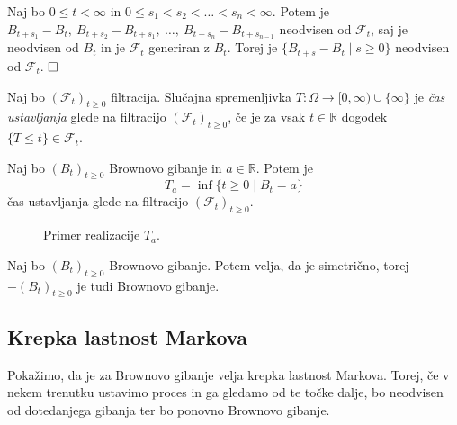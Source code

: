 \documentclass[twoside,11pt]{article}
\begin{document}
\begin{dokaz}
    Naj bo $0 \leq t < \infty$ in $0 \leq s_1 < s_2 < \dots < s_n < \infty$. 
    Potem je $B_{t+s_1} - B_t, \ B_{t+s_2} - B_{t+s_1}, \ \dots, \ B_{t+s_n} - B_{t+s_{n-1}}$ 
    neodvisen od $\mathcal{F}_t$, saj je neodvisen od $B_t$ in je $\mathcal{F}_t$ generiran z 
    $B_t$. Torej je $\{B_{t+s}-B_t\mid s\geq 0\}$ neodvisen od $\mathcal{F}_t$.
    $\hfill \square$
\end{dokaz}

\begin{definicija}
    Naj bo $(\mathcal{F}_t)_{t\geq0}$ filtracija. Slučajna spremenljivka $T: \Omega \rightarrow [0, \infty)\cup \{\infty\}$ 
    je \textit{čas ustavljanja} glede na filtracijo $(\mathcal{F}_t)_{t\geq0}$, če je za vsak $t \in \mathbb{R}$ dogodek $\{T \leq t\} \in \mathcal{F}_t$.
\end{definicija}

\begin{primer}
    Naj bo $(B_t)_{t\geq0}$ Brownovo gibanje in $a \in \mathbb{R}$. Potem je
    $$
        T_a = \inf\{t \geq 0 \mid B_t = a\}
    $$
    čas ustavljanja glede na filtracijo $(\mathcal{F}_t)_{t\geq0}$.
\end{primer}

\begin{figure}[h]
    \centering
    \caption{Primer realizacije $T_a$.}
    \label{fig:slika3}
\end{figure}



\begin{trditev}
    Naj bo $(B_t)_{t\geq 0}$ Brownovo gibanje. Potem velja, da je simetrično,
    torej $-(B_{t})_{t\geq0}$ je tudi Brownovo gibanje.
\end{trditev}

\subsection{Krepka lastnost Markova}
Pokažimo, da je za Brownovo gibanje velja krepka lastnost Markova. Torej, če 
v nekem trenutku ustavimo proces in ga gledamo od te točke dalje, bo neodvisen od
dotedanjega gibanja ter bo ponovno Brownovo gibanje.
\end{document}

